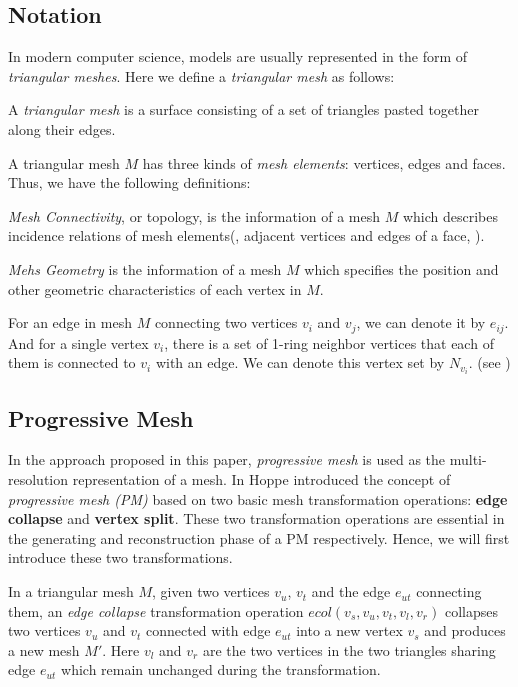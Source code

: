 \subsection{Notation}
\label{subsection:notation}
In modern computer science, models are usually represented in the form of \emph{triangular meshes}. Here we define a \emph{triangular mesh} as follows:
\begin{defn}
	A \emph{triangular mesh} is a surface consisting of a set of triangles pasted together along their edges\cite{Hoppe:1996:PM}. 
\end{defn}
A triangular mesh $M$ has three kinds of \emph{mesh elements}: vertices, edges and faces. Thus, we have the following definitions:
\begin{defn}
	\emph{Mesh Connectivity}, or topology, is the information of a mesh $M$ which describes incidence relations of mesh elements(\eg, adjacent vertices and edges of a face, \etc).   
\end{defn}
\begin{defn}
	\emph{Mehs Geometry} is the information of a mesh $M$ which specifies the position and other geometric characteristics of each vertex in $M$.
\end{defn}



For an edge in mesh $M$ connecting two vertices $v_i$ and $v_j$, we can denote it by $e_{ij}$. And for a single vertex $v_i$, there is a set of 1-ring neighbor vertices that each of them is connected to $v_i$ with an edge. We can denote this vertex set by $N_{v_i}$. (see )

\subsection{Progressive Mesh}
\label{subsection:theoreticalPM}
In the approach proposed in this paper, \emph{progressive mesh} is used as the multi-resolution representation of a mesh. In \cite{Hoppe:1996:PM} Hoppe \etal introduced the concept of \emph{progressive mesh (PM)} based on two basic mesh transformation operations: \textbf{edge collapse} and \textbf{vertex split}. These two transformation operations are essential in the generating and reconstruction phase of a PM respectively. Hence, we will first introduce these two transformations. 

\begin{defn}
	In a triangular mesh $M$, given two vertices $v_u$, $v_t$ and the edge $e_{ut}$ connecting them, an \emph{edge collapse} transformation operation $ecol(v_s,v_u,v_t,v_l,v_r)$ collapses two vertices $v_u$ and $v_t$ connected with edge $e_{ut}$ into a new vertex $v_s$ and produces a new mesh $M'$. Here $v_l$ and $v_r$ are the two vertices in the two triangles sharing edge $e_{ut}$ which remain unchanged during the transformation. 
\end{defn}

